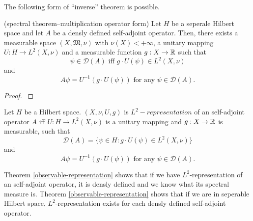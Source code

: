 \documentclass[main.tex]{subfiles}
\begin{document}
The following form of ``inverse'' theorem is possible.
\begin{theorem} (spectral theorem--multiplication operator form)
\label{spectral-operator-form}
Let $H$ be a seperale Hilbert space and let $A$ be a densly defined self-adjoint operator. Then, there exists a measurable space $(X, \mathfrak{M}, \nu)$ 
with $\nu(X)<+\infty$, a unitary mapping $U:H\to L^2(X, \nu)$ and a measurable function $g:X \to \mathbb{R}$ such that
\begin{equation}
\psi\in\mathcal{D}(A) \text{ iff } g\cdot U(\psi)\in L^2(X,\nu)
\end{equation}
and 
\begin{equation}
A\psi = U^{-1}(g\cdot U(\psi)) \text{ for any } \psi\in\mathcal{D}(A).
\end{equation}
\end{theorem}
\begin{proof}
\cite[see][VIII.3 The spectral theorem]{reed-simon1980}
\end{proof}
\begin{definition}
\label{L2-representation}
Let $H$ be a Hilbert space. 
$(X, \nu, U, g)$ is $L^2-representation$ of an self-adjoint operator $A$ iff
$U:H\to L^2(X, \nu)$ is a unitary mapping and $g:X\to \mathbb{R}$ is measurable, such that
\begin{equation}
\mathcal{D}(A) = \{\psi\in H: g\cdot U(\psi)\in L^2(X, \nu)\}
\end{equation}
and
\begin{equation}
A\psi = U^{-1}(g\cdot U(\psi)) \text{ for any } \psi\in\mathcal{D}(A).
\end{equation}
\end{definition}
Theorem \ref{observable-representation} shows that if we have $L^2$-representation of an self-adjoint operator, it is densly defined and we know what its spectral measure is. Theorem \ref{observable-representation} shows that if we are in seperable Hilbert space, $L^2$-representation exists for each densly defined self-adjoint operator.
\end{document}
